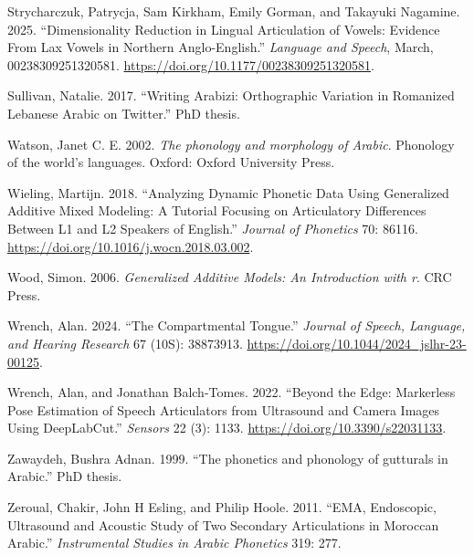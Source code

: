 \documentclass[
]{interact}
\newlength{\cslhangindent}
\newenvironment{CSLReferences}[2] %
 {\begin{list}{}{%
  \setlength{\itemindent}{0pt}
  \setlength{\leftmargin}{0pt}
  \setlength{\parsep}{0pt}
  \ifodd #1
   \setlength{\leftmargin}{\cslhangindent}
   \setlength{\itemindent}{-1\cslhangindent}
  \fi
  \setlength{\itemsep}{#2\baselineskip}}}
 {\end{list}}
\begin{document}
\begin{CSLReferences}{1}{0}
Strycharczuk, Patrycja, Sam Kirkham, Emily Gorman, and Takayuki
Nagamine. 2025. {``Dimensionality Reduction in Lingual Articulation of
Vowels: Evidence From Lax Vowels in Northern Anglo-English.''}
\emph{Language and Speech}, March, 00238309251320581.
\url{https://doi.org/10.1177/00238309251320581}.

Sullivan, Natalie. 2017. {``Writing Arabizi: Orthographic Variation in
Romanized Lebanese Arabic on Twitter.''} PhD thesis.

Watson, Janet C. E. 2002. \emph{The phonology and morphology of Arabic}.
Phonology of the world's languages. Oxford: Oxford University Press.

Wieling, Martijn. 2018. {``Analyzing Dynamic Phonetic Data Using
Generalized Additive Mixed Modeling: A Tutorial Focusing on Articulatory
Differences Between L1 and L2 Speakers of English.''} \emph{Journal of
Phonetics} 70: 86116. \url{https://doi.org/10.1016/j.wocn.2018.03.002}.

Wood, Simon. 2006. \emph{Generalized Additive Models: An Introduction
with r}. CRC Press.

Wrench, Alan. 2024. {``The Compartmental Tongue.''} \emph{Journal of
Speech, Language, and Hearing Research} 67 (10S): 38873913.
\url{https://doi.org/10.1044/2024_jslhr-23-00125}.

Wrench, Alan, and Jonathan Balch-Tomes. 2022. {``Beyond the Edge:
Markerless Pose Estimation of Speech Articulators from Ultrasound and
Camera Images Using DeepLabCut.''} \emph{Sensors} 22 (3): 1133.
\url{https://doi.org/10.3390/s22031133}.

Zawaydeh, Bushra Adnan. 1999. {``The phonetics and phonology of
gutturals in Arabic.''} PhD thesis.

Zeroual, Chakir, John H Esling, and Philip Hoole. 2011. {``EMA,
Endoscopic, Ultrasound and Acoustic Study of Two Secondary Articulations
in Moroccan Arabic.''} \emph{Instrumental Studies in Arabic Phonetics}
319: 277.

\end{CSLReferences}
\end{document}
